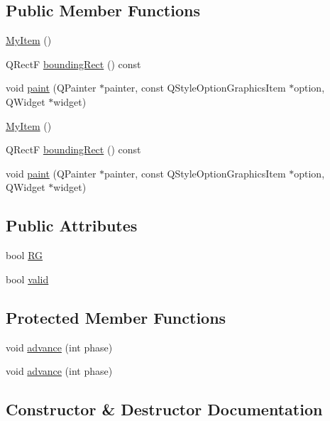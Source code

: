 \subsection*{Public Member Functions}
\begin{DoxyCompactItemize}
\item 
\hyperlink{classMyItem_a9507a67820323a0c2fca0023aed44fed}{My\+Item} ()
\item 
Q\+RectF \hyperlink{classMyItem_ad287d7475bc642329fbc0e074bbe7458}{bounding\+Rect} () const 
\item 
void \hyperlink{classMyItem_ab038ec9fec1da2aba8fb9fa87d65b28d}{paint} (Q\+Painter $\ast$painter, const Q\+Style\+Option\+Graphics\+Item $\ast$option, Q\+Widget $\ast$widget)
\item 
\hyperlink{classMyItem_a9507a67820323a0c2fca0023aed44fed}{My\+Item} ()
\item 
Q\+RectF \hyperlink{classMyItem_ad287d7475bc642329fbc0e074bbe7458}{bounding\+Rect} () const 
\item 
void \hyperlink{classMyItem_ab038ec9fec1da2aba8fb9fa87d65b28d}{paint} (Q\+Painter $\ast$painter, const Q\+Style\+Option\+Graphics\+Item $\ast$option, Q\+Widget $\ast$widget)
\end{DoxyCompactItemize}
\subsection*{Public Attributes}
\begin{DoxyCompactItemize}
\item 
bool \hyperlink{classMyItem_a8062967505fab8ad3d54e71c04876c7f}{RG}
\item 
bool \hyperlink{classMyItem_aaeda1d0e2b67ff57fc2206c9e8d8e5e2}{valid}
\end{DoxyCompactItemize}
\subsection*{Protected Member Functions}
\begin{DoxyCompactItemize}
\item 
void \hyperlink{classMyItem_a0065ee31a5a17b10703e7edae0526814}{advance} (int phase)
\item 
void \hyperlink{classMyItem_a0065ee31a5a17b10703e7edae0526814}{advance} (int phase)
\end{DoxyCompactItemize}


\subsection{Constructor \& Destructor Documentation}
